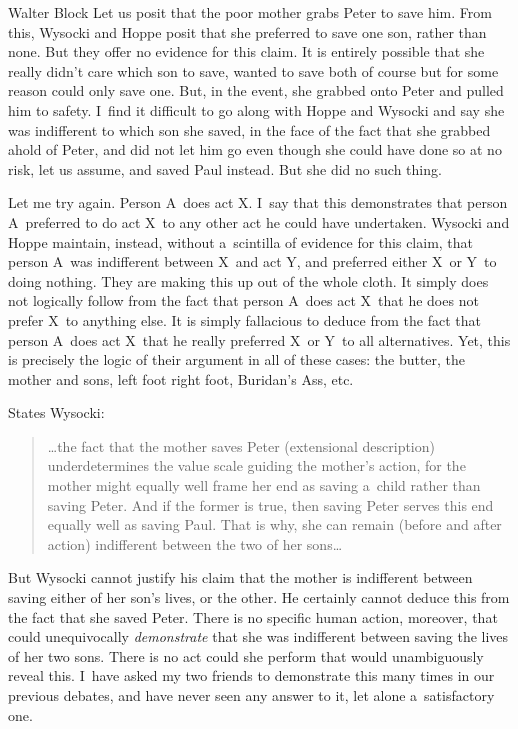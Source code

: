 \begin{artengenv}{Walter Block}
Let us posit that the poor mother grabs Peter to save him. From this, Wysocki and Hoppe posit that she preferred to save one son, rather than none. But they offer no evidence for this claim. It is entirely possible that she really didn't care which son to save, wanted to save both of course but for some reason could only save one. But, in the event, she grabbed onto Peter and pulled him to safety. I~find it difficult to go along with Hoppe and Wysocki and say she was indifferent to which son she saved, in the face of the fact that she grabbed ahold of Peter, and did not let him go even though she could have done so at no risk, let us assume, and saved Paul instead. But she did no such thing.



Let me try again. Person A~does act X. I~say that this demonstrates that person A~preferred to do act X~to any other act he could have undertaken. Wysocki and Hoppe maintain, instead, without a~scintilla of evidence for this claim, that person A~was indifferent between X~and act Y, and preferred either X~or Y~to doing nothing. They are making this up out of the whole cloth. It simply does not logically follow from the fact that person A~does act X~that he does not prefer X~to anything else. It is simply fallacious to deduce from the fact that person A~does act X~that he really preferred X~or Y~to all alternatives. Yet, this is precisely the logic of their argument in all of these cases: the butter, the mother and sons, left foot right foot, Buridan's Ass, etc.



States Wysocki:



\begin{quote}
…the fact that the mother saves Peter (extensional description) underdetermines the value scale guiding the mother's action, for the mother might equally well frame her end as saving a~child rather than saving Peter. And if the former is true, then saving Peter serves this end equally well as saving Paul. That is why, she can remain (before and after action) indifferent between the two of her sons…
\end{quote}



But Wysocki cannot justify his claim that the mother is indifferent between saving either of her son's lives, or the other. He certainly cannot deduce this from the fact that she saved Peter. There is no specific human action, moreover, that could unequivocally \textit{demonstrate} that she was indifferent between saving the lives of her two sons. There is no act could she perform that would unambiguously reveal this. I~have asked my two friends to demonstrate this many times in our previous debates, and have never seen any answer to it, let alone a~satisfactory one.




\end{artengenv}
